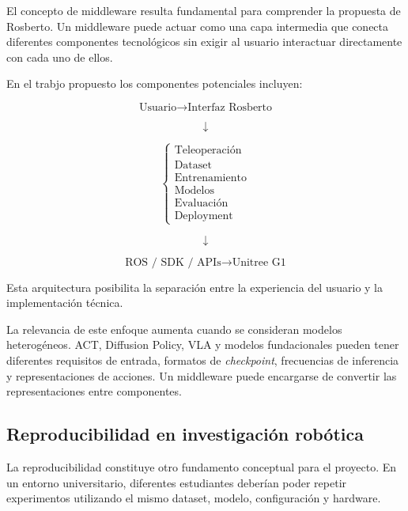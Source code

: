 \documentclass[stu,12pt,floatsintext]{apa7}
\begin{document}
El concepto de middleware resulta fundamental para comprender la propuesta de Rosberto. Un middleware puede actuar como una capa intermedia que conecta diferentes componentes tecnológicos sin exigir al usuario interactuar directamente con cada uno de ellos.

En el trabjo propuesto los componentes potenciales incluyen:

\begin{equation}
\text{Usuario}
\rightarrow
\text{Interfaz Rosberto}
\end{equation}

\begin{equation}
\downarrow
\end{equation}

\begin{equation}
\begin{cases}
\text{Teleoperación}\\
\text{Dataset}\\
\text{Entrenamiento}\\
\text{Modelos}\\
\text{Evaluación}\\
\text{Deployment}
\end{cases}
\end{equation}

\begin{equation}
\downarrow
\end{equation}

\begin{equation}
\text{ROS / SDK / APIs}
\rightarrow
\text{Unitree G1}
\end{equation}

Esta arquitectura posibilita la separación entre la experiencia del usuario y la implementación técnica.

La relevancia de este enfoque aumenta cuando se consideran modelos heterogéneos. ACT, Diffusion Policy, VLA y modelos fundacionales pueden tener diferentes requisitos de entrada, formatos de \textit{checkpoint}, frecuencias de inferencia y representaciones de acciones. Un middleware puede encargarse de convertir las representaciones entre componentes.

\subsection{Reproducibilidad en investigación robótica}

La reproducibilidad constituye otro fundamento conceptual para el proyecto. En un entorno universitario, diferentes estudiantes deberían poder repetir experimentos utilizando el mismo dataset, modelo, configuración y hardware.
\end{document}
